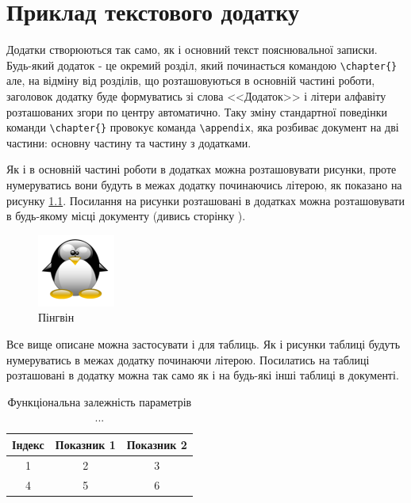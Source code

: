 \chapter[(Довідковий) Приклад текстового додатку]{Приклад текстового додатку}
\label{apdx:text}

Додатки створюються так само, як і основний текст пояснювальної записки. Будь-який додаток - це окремий розділ, який
починається командою \verb|\chapter{}| але, на відміну від розділів, що розташовуються в основній частині роботи, заголовок
додатку буде формуватись зі слова <<Додаток>>  і літери алфавіту розташованих згори по центру автоматично. Таку зміну
стандартної поведінки команди \verb|\chapter{}| провокує команда \verb|\appendix|, яка розбиває документ на дві частини: 
основну частину та частину з додатками.

Як і в основній частині роботи в додатках можна розташовувати рисунки, проте нумеруватись вони будуть в межах додатку
починаючись літерою, як показано на рисунку \ref{apdxfig:tux}. Посилання на рисунки розташовані в додатках можна розташовувати 
в будь-якому місці документу (дивись сторінку \pageref{linkpage}).


\begin{figure}[h]
 \centering\includegraphics{img/Tux.png}
 \caption{Пінгвін}
 \label{apdxfig:tux}
\end{figure}

Все вище описане можна застосувати і для таблиць. Як і рисунки таблиці будуть нумеруватись в межах додатку починаючи літерою.
Посилатись на таблиці розташовані в додатку можна так само як і на будь-які інші таблиці в документі. 

\begin{table}[h]
\caption{\label{apdxtable:1}Функціональна залежність параметрів ...}
 \begin{tabular}{|c|c|c|}
 \hline 
 Індекс & Показник 1 & Показник 2\tabularnewline
 \hline\hline 
 1      & 2          & 3         \tabularnewline
 \hline
 4      & 5          & 6         \tabularnewline
 \hline 
\end{tabular}
\end{table}
  


